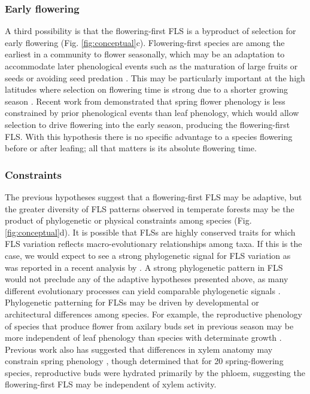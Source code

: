 \documentclass[11pt]{article}
\begin{document}
\subsubsection*{Early flowering}
\noindent A third possibility is that the flowering-first FLS is a byproduct of selection for early flowering  (Fig. \ref{fig:conceptual}c). Flowering-first species are among the earliest in a community to flower seasonally, which may be an adaptation to accommodate later phenological events such as the  maturation of large fruits or seeds \citep{Li2016,Primack1987,Ettinger2018} or avoiding seed predation \citep{Schermer2020}. This may be particularly important at the high latitudes where selection on flowering time is strong due  to a shorter growing season \citep{MunguiaRosas2011}. Recent work from \citet{Savage2019} demonstrated that spring flower phenology is less constrained by prior phenological events than leaf phenology, which would allow selection to drive flowering into the early season, producing the flowering-first FLS. With this hypothesis there is no specific advantage to a species flowering before or after leafing; all that matters is its absolute flowering time.

\subsubsection*{Constraints}
\noindent {}The previous hypotheses suggest that a flowering-first FLS may be adaptive, but the greater diversity of FLS patterns observed in temperate forests may be the product of phylogenetic \citep{Gougherty2018} or physical \citep{Diggle1995,Diggle1999,Schaik1993} constraints among species  (Fig. \ref{fig:conceptual}d). It is possible that FLSs are highly conserved traits for which FLS variation reflects macro-evolutionary relationships among taxa. If this is the case, we would expect to see a strong phylogenetic signal for FLS variation as was reported in a recent analysis by \citet{Gougherty2018}. A strong phylogenetic pattern in FLS would not preclude any of the adaptive hypotheses presented above, as many different evolutionary processes can yield comparable phylogenetic signals \citep{Revell2008}.\\

\noindent Phylogenetic patterning for FLSs may be driven by developmental or architectural differences among species. For example, the reproductive phenology of species that produce flower from axilary buds set in previous season may be more independent of leaf phenology than species with determinate growth \citep{Rathcke_1985,Borchert1983,Schaik1993}. Previous work also has suggested that differences in xylem anatomy may constrain spring phenology \citep{Lechowicz_1995}, though \citet{Savage2019} determined that for 20 spring-flowering species, reproductive buds were hydrated primarily by the phloem, suggesting the flowering-first FLS may be independent of xylem activity. \\
\end{document}

